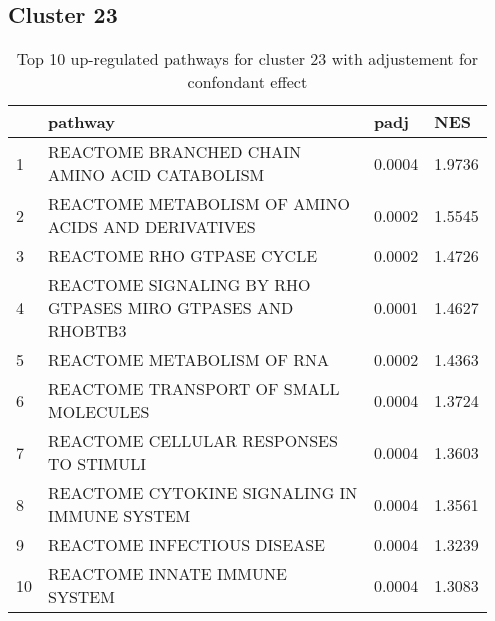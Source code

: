 \documentclass{article}
\begin{document}
\subsection{Cluster 23 }
\begin{table}[H]
\centering
\begin{tabular}{p{0.05\linewidth}p{0.7\linewidth}p{0.1\linewidth}p{0.1\linewidth}}
  \hline
 & pathway & padj & NES \\ 
  \hline
1 & REACTOME BRANCHED CHAIN AMINO ACID CATABOLISM & 0.0004 & 1.9736 \\ 
  2 & REACTOME METABOLISM OF AMINO ACIDS AND DERIVATIVES & 0.0002 & 1.5545 \\ 
  3 & REACTOME RHO GTPASE CYCLE & 0.0002 & 1.4726 \\ 
  4 & REACTOME SIGNALING BY RHO GTPASES MIRO GTPASES AND RHOBTB3 & 0.0001 & 1.4627 \\ 
  5 & REACTOME METABOLISM OF RNA & 0.0002 & 1.4363 \\ 
  6 & REACTOME TRANSPORT OF SMALL MOLECULES & 0.0004 & 1.3724 \\ 
  7 & REACTOME CELLULAR RESPONSES TO STIMULI & 0.0004 & 1.3603 \\ 
  8 & REACTOME CYTOKINE SIGNALING IN IMMUNE SYSTEM & 0.0004 & 1.3561 \\ 
  9 & REACTOME INFECTIOUS DISEASE & 0.0004 & 1.3239 \\ 
  10 & REACTOME INNATE IMMUNE SYSTEM & 0.0004 & 1.3083 \\ 
   \hline
\end{tabular}
\caption{Top 10 up-regulated pathways for cluster 23 with adjustement for confondant effect} 
\label{tab:q3_2_conf_23}
\end{table}
\end{document}
